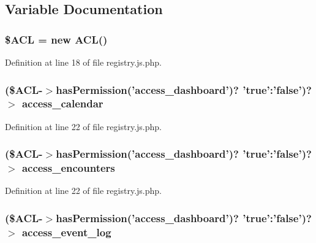 \subsection{\-Variable \-Documentation}
\hypertarget{registry_8js_8php_a0e6e927aed984ad8947f77bf803b70bb}{
\subsubsection[{\$\-A\-C\-L}]{\setlength{\rightskip}{0pt plus 5cm}\${\bf \-A\-C\-L} = new {\bf \-A\-C\-L}()}}\label{registry_8js_8php_a0e6e927aed984ad8947f77bf803b70bb}


\-Definition at line 18 of file registry.\-js.\-php.

\hypertarget{registry_8js_8php_a9ced7ed4196dcc2c8d961cadca45c40d}{
\subsubsection[{access\-\_\-calendar}]{ (\${\bf \-A\-C\-L}-\/$>$has\-Permission('access\-\_\-dashboard')? 'true'\-:'false')?$>$ {\bf access\-\_\-calendar}}}\label{registry_8js_8php_a9ced7ed4196dcc2c8d961cadca45c40d}


\-Definition at line 22 of file registry.\-js.\-php.

\hypertarget{registry_8js_8php_a7398f6e50dbebbc4384d14ed6aaaf931}{
\subsubsection[{access\-\_\-encounters}]{ (\${\bf \-A\-C\-L}-\/$>$has\-Permission('access\-\_\-dashboard')? 'true'\-:'false')?$>$ {\bf access\-\_\-encounters}}}\label{registry_8js_8php_a7398f6e50dbebbc4384d14ed6aaaf931}


\-Definition at line 22 of file registry.\-js.\-php.

\hypertarget{registry_8js_8php_ad23557ad0f582dcefd35ea7bf873175c}{
\subsubsection[{access\-\_\-event\-\_\-log}]{ (\${\bf \-A\-C\-L}-\/$>$has\-Permission('access\-\_\-dashboard')? 'true'\-:'false')?$>$ {\bf access\-\_\-event\-\_\-log}}}\label{registry_8js_8php_ad23557ad0f582dcefd35ea7bf873175c}


